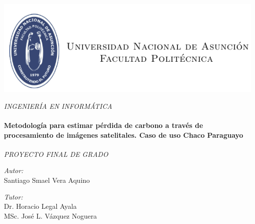 \documentclass[11pt, a4paper, oneside]{Thesis} %
\begin{document}
\begin{titlepage}
\begin{center}
\includegraphics[scale=1]{./Figures/logo.png} %

\large \textit{INGENIERÍA EN INFORMÁTICA}\\[0.3cm]

\HRule \\[0.4cm] %
{\huge \bfseries Metodolog\'ia para estimar p\'erdida de
	carbono a trav\'es de procesamiento de im\'agenes
	satelitales. Caso de uso Chaco Paraguayo}\\[0.4cm] %
\HRule \\[1.5cm] %
 
\large \textit{PROYECTO FINAL DE GRADO}\\[0.3cm]
 

 \vfill
 
\vfill

\vfill

\begin{minipage}{0.4\textwidth}
\begin{center} \large
\emph{Autor:}\\
{Santiago Smael Vera Aquino}
\end{center}
\end{minipage} 
 \hfill\begin{minipage}{0.4\textwidth}
\begin{center} \large
\emph{Tutor:}\\ 
{Dr. Horacio Legal Ayala} \\
{MSc. Jos\'e L. V\'azquez Noguera} \\
\end{center}
\end{minipage}\\[3cm]



\end{center}
\end{titlepage}
\end{document}
